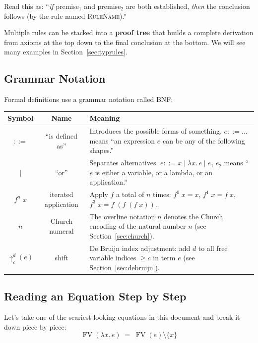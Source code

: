 \documentclass[11pt,a4paper]{article}
\theoremstyle{definition}
\newcommand{\lam}{\lambda}
\newcommand{\FV}{\operatorname{FV}}
\newcommand{\church}[1]{\overline{#1}}
\begin{document}
Read this as: ``\textit{if} premise$_1$ and premise$_2$ are both established,
\textit{then} the conclusion follows (by the rule named \textsc{RuleName}).''

Multiple rules can be stacked into a \textbf{proof tree} that builds a
complete derivation from axioms at the top down to the final conclusion at the
bottom. We will see many examples in Section~\ref{sec:typrules}.

\subsection{Grammar Notation}

Formal definitions use a grammar notation called BNF:

\begin{center}
\renewcommand{\arraystretch}{1.6}
\begin{tabular}{ccp{8.5cm}}
\textbf{Symbol} & \textbf{Name} & \textbf{Meaning} \\
\hline
$::=$ & ``is defined as'' &
  Introduces the possible forms of something. $e ::= \ldots$ means
  ``an expression $e$ can be any of the following shapes.'' \\

$\mid$ & ``or'' &
  Separates alternatives. $e ::= x \mid \lam x.\, e \mid e_1\;e_2$ means
  ``$e$ is either a variable, or a lambda, or an application.'' \\

$f^n\; x$ & iterated application &
  Apply $f$ a total of $n$ times: $f^0\;x = x$, $f^1\;x = f\;x$,
  $f^3\;x = f\;(f\;(f\;x))$. \\

$\church{n}$ & Church numeral &
  The overline notation $\church{n}$ denotes the Church encoding of
  the natural number $n$ (see Section~\ref{sec:church}). \\

$\uparrow^d_c(e)$ & shift &
  De Bruijn index adjustment: add $d$ to all free variable indices
  $\geq c$ in term $e$ (see Section~\ref{sec:debruijn}). \\
\end{tabular}
\end{center}

\subsection{Reading an Equation Step by Step}\label{sec:readingeqs}

Let's take one of the scariest-looking equations in this document and break it
down piece by piece:
\[
  \FV(\lam x.\, e) \;=\; \FV(e) \setminus \{x\}
\]
\end{document}
